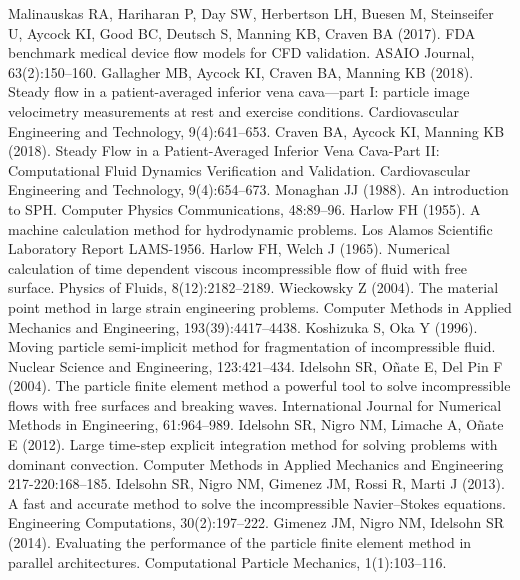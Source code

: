  Malinauskas RA, Hariharan P, Day SW, Herbertson LH, Buesen M, Steinseifer U, Aycock KI, Good BC, Deutsch S, Manning KB, Craven BA (2017). FDA benchmark medical device flow models for CFD validation. ASAIO Journal, 63(2):150--160.
 Gallagher MB, Aycock KI, Craven BA, Manning KB (2018). Steady flow in a patient-averaged inferior vena cava—part I: particle image velocimetry measurements at rest and exercise conditions. Cardiovascular Engineering and Technology, 9(4):641--653.
 Craven BA, Aycock KI, Manning KB (2018). Steady Flow in a Patient-Averaged Inferior Vena Cava-Part II: Computational Fluid Dynamics Verification and Validation. Cardiovascular Engineering and Technology, 9(4):654--673.
 Monaghan JJ (1988). An introduction to SPH. Computer Physics Communications, 48:89--96.
 Harlow FH (1955). A machine calculation method for hydrodynamic problems. Los Alamos Scientific Laboratory Report LAMS-1956.
 Harlow FH, Welch J (1965). Numerical calculation of time dependent viscous incompressible flow of fluid with free surface. Physics of Fluids, 8(12):2182--2189.
 Wieckowsky Z (2004). The material point method in large strain engineering problems. Computer Methods in Applied Mechanics and Engineering, 193(39):4417--4438.
 Koshizuka S, Oka Y (1996). Moving particle semi-implicit method for fragmentation of incompressible fluid. Nuclear Science and Engineering, 123:421--434.
 Idelsohn SR, O\~nate E, Del Pin F (2004). The particle finite element method a powerful tool to solve incompressible flows with free surfaces and breaking waves. International Journal for Numerical Methods in Engineering, 61:964--989.
 Idelsohn SR, Nigro NM, Limache A, O\~nate E (2012). Large time-step explicit integration method for solving problems with dominant convection. Computer Methods in Applied Mechanics and Engineering 217-220:168--185.
 Idelsohn SR, Nigro NM, Gimenez JM, Rossi R, Marti J (2013). A fast and accurate method to solve the incompressible Navier--Stokes equations. Engineering Computations, 30(2):197--222.
 Gimenez JM, Nigro NM, Idelsohn SR (2014). Evaluating the performance of the particle finite element method in parallel architectures. Computational Particle Mechanics, 1(1):103--116.
